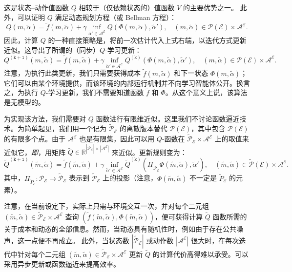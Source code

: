 \documentclass{amsproc}
\theoremstyle{definition}
\theoremstyle{remark}
\numberwithin{equation}{section}
\newcommand{\RR}{{\mathbb R}}
\newcommand{\cA}{{\mathcal A}}
\newcommand{\cE}{{\mathcal E}}
\newcommand{\cP}{{\mathcal P}}
\newcommand{\ctrl}{\alpha}
\begin{document}
 这是状态--动作值函数 $Q$ 相较于（仅依赖状态的）值函数 $V$ 的主要优势之一。 
 此外，可以证明 $Q$ 满足动态规划方程（或 Bellman 方程）：
$$
	 Q(m,\tilde\ctrl) = \tilde f(m,\tilde\ctrl) + \gamma \inf_{\tilde\ctrl' \in \cA^{\cE}} Q(\Phi(m, \tilde\ctrl), \tilde\ctrl'), \quad (m,\tilde\ctrl) \in \cP(\cE) \times \cA^{\cE}.
$$
因此，计算 $Q$ 的一种直接策略是，将前一次估计代入上式右端，以迭代方式更新近似。这导出了所谓的（同步）$Q$-学习更新：
\begin{equation}
\label{eq:MFC-Q-updates}
	 Q^{(\mathtt{k+1})}(m,\tilde\ctrl) = \tilde f(m,\tilde\ctrl) + \gamma \inf_{\tilde\ctrl' \in \cA^{\cE}} Q^{(\mathtt{k})}(\Phi(m, \tilde\ctrl), \tilde\ctrl'), \quad (m,\tilde\ctrl) \in \cP(\cE) \times \cA^{\cE}.
\end{equation}
注意，为执行此类更新，我们只需要获得成本 $\tilde f(m,\tilde\ctrl)$ 和下一状态 $\Phi(m, \tilde\ctrl)$；它们可以由某个环境提供，而该环境的内部运行机制并不向学习智能体公开。换言之，为执行 $Q$-学习更新，我们不需要知道函数 $\tilde f$ 和 $\Phi$。从这个意义上说，该算法是无模型的。

为实现该方法，我们需要对 $Q$ 函数进行有限维近似。这里我们不讨论函数逼近技术。为简单起见，我们用一个记为 $\tilde\cP_\cE$ 的离散版本替代 $\cP(\cE)$，其中包含 $\cP(\cE)$ 的有限多个点。由于 $\cA^\cE$ 也是有限集，因此可以用 $Q$-函数在 $\tilde\cP_\cE \times \cA^\cE$ 上的取值来近似它，\textit{即}，用矩阵 $\tilde Q \in \RR^{|\tilde\cP_\cE| \times |\cA^\cE|}$ 来近似。更新规则变为：
\begin{equation}
\label{eq:MFC-Q-updates-proj}
	 \tilde Q^{(\mathtt{k+1})}(\tilde m,\tilde\ctrl) = \tilde f(\tilde m,\tilde\ctrl) + \gamma \inf_{\tilde\ctrl' \in \cA^{\cE}} \tilde Q^{(\mathtt{k})}(\Pi_{\tilde \cP_\cE} \Phi(\tilde m, \tilde\ctrl), \tilde\ctrl'), \quad (\tilde m, \tilde\ctrl) \in \tilde\cP(\cE) \times \cA^{\cE}.
\end{equation}
其中，$\Pi_{\tilde P_\cE}: \cP_\cE \to \tilde \cP_\cE$ 表示到 $\tilde\cP_\cE$ 上的投影（注意，$\Phi(\tilde m, \tilde\ctrl)$ 不一定是 $\tilde P_\cE$ 的元素）。 

注意，在当前设定下，实际上只需与环境交互一次，并对每个二元组 $(\tilde m, \tilde \ctrl) \in \tilde \cP_\cE \times \cA^\cE$ 查询 $(\tilde f(\tilde m,\tilde \ctrl), \Phi(\tilde m, \tilde \ctrl))$，便可获得计算 $\tilde Q$ 函数所需的关于成本和动态的全部信息。然而，当动态具有随机性时，例如由于存在公共噪声，这一点便不再成立。 
 此外，当状态数 $|\tilde\cP_\cE|$ 或动作数 $|\cA^\cE|$ 很大时，在每次迭代中针对每个二元组 $(\tilde m,\tilde \ctrl) \in \tilde\cP_\cE \times \cA^\cE$ 更新 $\tilde Q$ 的计算代价高得难以承受。可以采用异步更新或函数逼近来提高效率。 
\end{document}
